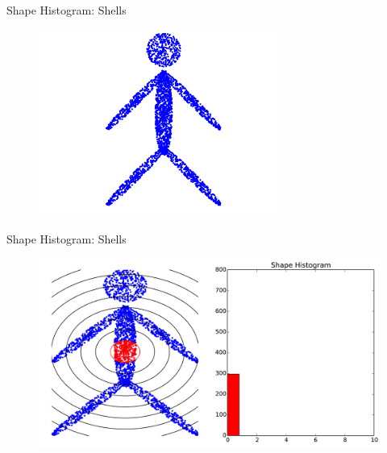 \documentclass{beamer}
\begin{document}
\begin{frame}{Shape Histogram: Shells}

\begin{figure}[t]
	\centering
    \includegraphics[width=0.7\textwidth]{Person.pdf}
\end{figure}

\end{frame}

\begin{frame}{Shape Histogram: Shells}

\begin{figure}[t]
	\centering
    \includegraphics[width=\textwidth]{ShapeHist1.pdf}
\end{figure}

\end{frame}
\end{document}

